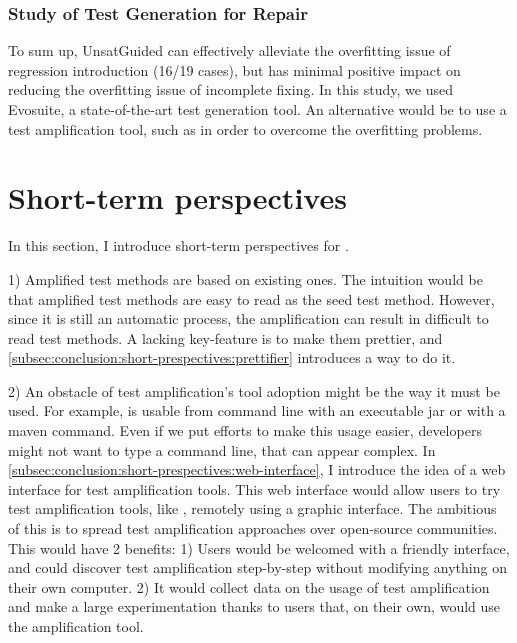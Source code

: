 \subsubsection{Study of Test Generation for Repair}
\label{subsubsec:conclusion:contributions-summary:transversal-contributions:test-for-repair}

To sum up, UnsatGuided can effectively alleviate the overfitting issue of regression introduction (16/19 cases), but has minimal positive impact on reducing the overfitting issue of incomplete fixing.
In this study, we used Evosuite, a state-of-the-art test generation tool.
An alternative would be to use a test amplification tool, such as \dspot in order to overcome the overfitting problems.

\section{Short-term perspectives}
\label{sec:conclusion:short-prespectives}

In this section, I introduce short-term perspectives for \dspot.

1) Amplified test methods are based on existing ones.
The intuition would be that amplified test methods are easy to read as the seed test method.
However, since it is still an automatic process, the amplification can result in  difficult to read test methods.
A lacking key-feature is to make them prettier, and \autoref{subsec:conclusion:short-prespectives:prettifier} introduces a way to do it.

2) An obstacle of test amplification's tool adoption might be the way it must be used.
For example, \dspot is usable from command line with an executable jar or with a maven command.
Even if we put efforts to make this usage easier, developers might not want to type a command line, that can appear complex.
In \autoref{subsec:conclusion:short-prespectives:web-interface}, I introduce the idea of a web interface for test amplification tools.
This web interface would allow users to try test amplification tools, like \dspot, remotely using a graphic interface.
The ambitious of this is to spread test amplification approaches over open-source communities.
This would have 2 benefits:
1) Users would be welcomed with a friendly interface, and could discover test amplification step-by-step without modifying anything on their own computer.
2) It would collect data on the usage of test amplification and make a large experimentation thanks to users that, on their own, would use the amplification tool.

